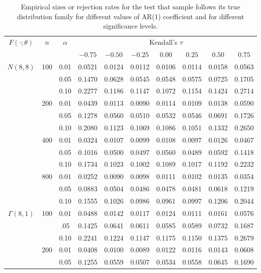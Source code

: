 \documentclass[12pt]{article}
\begin{document}
\begin{table}[tbp]
\centering
\caption{Empirical sizes or rejection rates
for the test that sample follows its true distribution family for
different values of AR(1) coefficient and for different
significance levels.}
\label{table:size}
\begin{tabular}{ccc ccc c ccc}
  \toprule
$F(\cdot; \theta)$ & $n$ & $\alpha$ & \multicolumn{7}{c}{Kendall's $\tau$}\\
\cmidrule(lr){4-10}
   &  &  & $-0.75$ & $ -0.50$ & $-0.25$ & $0.00$ & $0.25$ & $0.50$ & $ 0.75$ \\
  \midrule
{$N(8,8)$} & {100} & 0.01 & 0.0521 & 0.0124 & 0.0112 & 0.0106 & 0.0114 & 0.0158 & 0.0563 \\
& & 0.05 & 0.1470 & 0.0628 & 0.0545 & 0.0548 & 0.0575 & 0.0725 & 0.1705 \\
& & 0.10 & 0.2277 & 0.1186 & 0.1147 & 0.1072 & 0.1154 & 0.1424 & 0.2714 \\
& {200} & 0.01 & 0.0439 & 0.0113 & 0.0090 & 0.0114 & 0.0109 & 0.0138 & 0.0590 \\
& & 0.05 & 0.1278 & 0.0560 & 0.0510 & 0.0532 & 0.0546 & 0.0691 & 0.1726 \\
& & 0.10 & 0.2080 & 0.1123 & 0.1069 & 0.1086 & 0.1051 & 0.1332 & 0.2650 \\
& {400} & 0.01 & 0.0324 & 0.0107 & 0.0099 & 0.0108 & 0.0097 & 0.0126 & 0.0467 \\
& & 0.05 & 0.1016 & 0.0500 & 0.0497 & 0.0560 & 0.0489 & 0.0592 & 0.1418 \\
& & 0.10 & 0.1734 & 0.1023 & 0.1002 & 0.1089 & 0.1017 & 0.1192 & 0.2232 \\
& {800} & 0.01 & 0.0252 & 0.0090 & 0.0098 & 0.0111 & 0.0102 & 0.0135 & 0.0354 \\
& & 0.05 & 0.0883 & 0.0504 & 0.0486 & 0.0478 & 0.0481 & 0.0618 & 0.1219 \\
& & 0.10 & 0.1555 & 0.1026 & 0.0986 & 0.0961 & 0.0997 & 0.1206 & 0.2044 \\ [1ex]
{$\Gamma(8,1)$} & {100} & 0.01 & 0.0488 & 0.0142 & 0.0117 & 0.0124 & 0.0111 & 0.0161 & 0.0576 \\
  & & .05 & 0.1425 & 0.0641 & 0.0611 & 0.0585 & 0.0589 & 0.0732 & 0.1687 \\
  & & 0.10 & 0.2241 & 0.1224 & 0.1147 & 0.1175 & 0.1150 & 0.1375 & 0.2679 \\
  & {200} & 0.01 & 0.0408 & 0.0100 & 0.0089 & 0.0122 & 0.0116 & 0.0143 & 0.0608 \\
  & & 0.05 & 0.1255 & 0.0559 & 0.0507 & 0.0534 & 0.0558 & 0.0645 & 0.1690 \\

\end{tabular}
\end{table}
\end{document}
